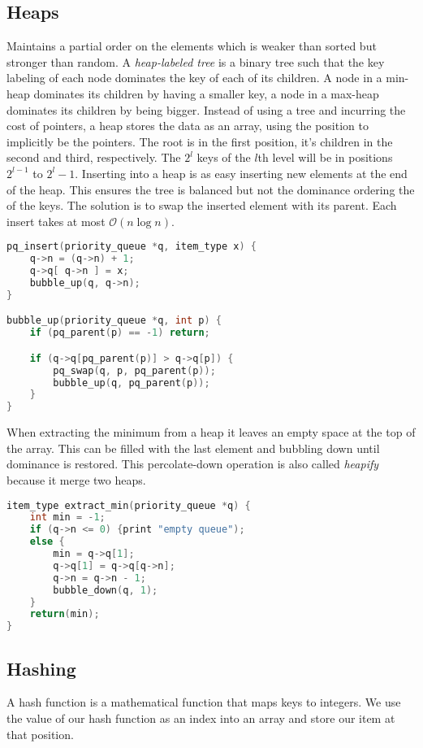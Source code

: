 \documentclass[10pt]{article}
\theoremstyle{definition}
\begin{document}
\subsection{Heaps}
Maintains a partial order on the elements which is weaker than sorted but stronger than random. A \textit{heap-labeled tree} is a binary tree such that the key labeling of each node dominates the key of each of its children. A node in a min-heap dominates its children by having a smaller key, a node in a max-heap dominates its children by being bigger. Instead of using a tree and incurring the cost of pointers, a heap stores the data as an array, using the position to implicitly be the pointers. The root is in the first position, it's children in the second and third, respectively. The $2^l$ keys of the $l$th level will be in positions $2^{l-1}$ to $2^l-1$. Inserting into a heap is as easy inserting new elements at the end of the heap. This ensures the tree is balanced but not the dominance ordering the of the keys. The solution is to swap the inserted element with its parent. Each insert takes at most $\mathcal{O}(n\log n)$. 

\begin{lstlisting}[language=C]
pq_insert(priority_queue *q, item_type x) {
    q->n = (q->n) + 1;
    q->q[ q->n ] = x;
    bubble_up(q, q->n);
}

bubble_up(priority_queue *q, int p) {
    if (pq_parent(p) == -1) return;

    if (q->q[pq_parent(p)] > q->q[p]) {
        pq_swap(q, p, pq_parent(p));
        bubble_up(q, pq_parent(p));
    }
}
\end{lstlisting}

When extracting the minimum from a heap it leaves an empty space at the top of the array. This can be filled with the last element and bubbling down until dominance is restored. This percolate-down operation is also called \hypertarget{heapify}{\textit{heapify}} because it merge two heaps.

\begin{lstlisting}[language=C]
item_type extract_min(priority_queue *q) {
    int min = -1;
    if (q->n <= 0) {print "empty queue");
    else {
        min = q->q[1];
        q->q[1] = q->q[q->n];
        q->n = q->n - 1;
        bubble_down(q, 1);
    }
    return(min);
}
\end{lstlisting}
     
\subsection{Hashing}
A hash function is a mathematical function that maps keys to integers. We use the value of our hash function as an index into an array and store our item at that position. 
\end{document}
